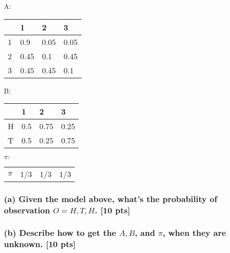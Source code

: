 \documentclass[twoside,11pt]{article}\usepackage{amsmath,amsfonts,amsthm,fullpage}
\begin{document}
\begin{table}[!htb]
    \begin{minipage}{.5\linewidth}
      \centering
A:
    \begin{tabular}{l|l|l|l}
    ~ & 1    & 2    & 3    \\\hline
    1 & 0.9  & 0.05 & 0.05 \\
    2 & 0.45 & 0.1  & 0.45 \\
    3 & 0.45 & 0.45 & 0.1  \\
    \end{tabular}

    \end{minipage}%
    \begin{minipage}{.5\linewidth}
      \centering

B:
    \begin{tabular}{l|l|l|l}
    ~ & 1   & 2    & 3    \\\hline
    H & 0.5 & 0.75 & 0.25 \\
    T & 0.5 & 0.25 & 0.75 \\
    \end{tabular}

    \end{minipage}

    \begin{minipage}{.5\linewidth}
      \centering
$\pi:$
    \begin{tabular}{llll}
    $\pi$ & 1/3 & 1/3 & 1/3 \\
    \end{tabular}
  \end{minipage}

\end{table}

\subsubsection*{(a) Given the model above, what's the probability of observation $O = {H,T,H}$. [10 pts]}

\iffalse
\subsubsection*{(b) Given the observation, what's the most likely sequence (the number of coin), how do you get the result? [5 pts]}
\fi
\subsubsection*{(b) Describe how to get the $A, B$, and $\pi$, when they are unknown. [10 pts]}
\end{document}
